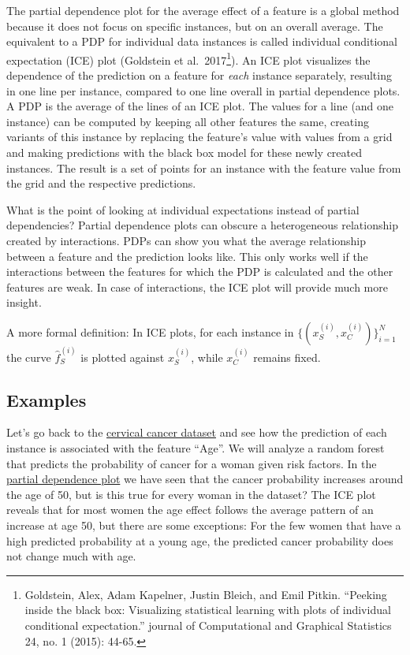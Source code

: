 \documentclass[
  10pt,
]{scrbook}
\begin{document}
The partial dependence plot for the average effect of a feature is a global method because it does not focus on specific instances, but on an overall average.
The equivalent to a PDP for individual data instances is called individual conditional expectation (ICE) plot (Goldstein et al.~2017\footnote{Goldstein, Alex, Adam Kapelner, Justin Bleich, and Emil Pitkin. ``Peeking inside the black box: Visualizing statistical learning with plots of individual conditional expectation.'' journal of Computational and Graphical Statistics 24, no. 1 (2015): 44-65.}).
An ICE plot visualizes the dependence of the prediction on a feature for \emph{each} instance separately, resulting in one line per instance, compared to one line overall in partial dependence plots.
A PDP is the average of the lines of an ICE plot.
The values for a line (and one instance) can be computed by keeping all other features the same, creating variants of this instance by replacing the feature's value with values from a grid and making predictions with the black box model for these newly created instances.
The result is a set of points for an instance with the feature value from the grid and the respective predictions.

What is the point of looking at individual expectations instead of partial dependencies?
Partial dependence plots can obscure a heterogeneous relationship created by interactions.
PDPs can show you what the average relationship between a feature and the prediction looks like.
This only works well if the interactions between the features for which the PDP is calculated and the other features are weak.
In case of interactions, the ICE plot will provide much more insight.

A more formal definition:
In ICE plots, for each instance in \(\{(x_{S}^{(i)},x_{C}^{(i)})\}_{i=1}^N\) the curve \(\hat{f}_S^{(i)}\) is plotted against \(x^{(i)}_{S}\), while \(x^{(i)}_{C}\) remains fixed.

\hypertarget{examples-4}{%
\subsection{Examples}\label{examples-4}}

Let's go back to the \protect\hyperlink{cervical}{cervical cancer dataset} and see how the prediction of each instance is associated with the feature ``Age''.
We will analyze a random forest that predicts the probability of cancer for a woman given risk factors.
In the \protect\hyperlink{pdp}{partial dependence plot} we have seen that the cancer probability increases around the age of 50, but is this true for every woman in the dataset?
The ICE plot reveals that for most women the age effect follows the average pattern of an increase at age 50, but there are some exceptions:
For the few women that have a high predicted probability at a young age, the predicted cancer probability does not change much with age.
\end{document}
